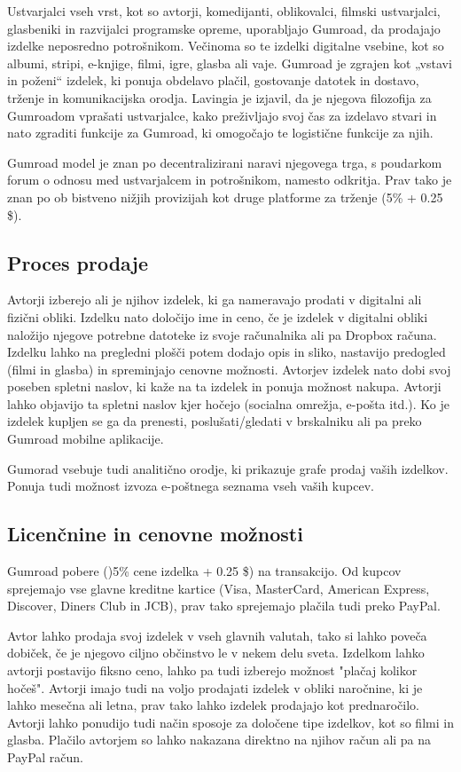 \documentclass[a4paper, 12pt]{book}
\begin{document}
Ustvarjalci vseh vrst, kot so avtorji, komedijanti, oblikovalci, filmski ustvarjalci, glasbeniki in razvijalci programske opreme, uporabljajo Gumroad, da prodajajo izdelke neposredno potrošnikom. Večinoma so te izdelki digitalne vsebine, kot so albumi, stripi, e-knjige, filmi, igre, glasba ali vaje. Gumroad je zgrajen kot „vstavi in poženi“ izdelek, ki ponuja obdelavo plačil, gostovanje datotek in dostavo, trženje in komunikacijska orodja. \cite{49} Lavingia je izjavil, da je njegova filozofija za Gumroadom vprašati ustvarjalce, kako preživljajo svoj čas za izdelavo stvari in nato zgraditi funkcije za Gumroad, ki omogočajo te logistične funkcije za njih. \cite{50}

Gumroad model je znan po decentralizirani naravi njegovega trga, s poudarkom forum o odnosu med ustvarjalcem in potrošnikom, namesto odkritja. Prav tako je znan po ob bistveno nižjih provizijah kot druge platforme za trženje (5\% + 0.25 \$). \cite{51}

\subsection{Proces prodaje}
Avtorji izberejo ali je njihov izdelek, ki ga nameravajo prodati v digitalni ali fizični obliki. Izdelku nato določijo ime in ceno, če je izdelek v digitalni obliki naložijo njegove potrebne datoteke iz svoje računalnika ali pa Dropbox računa. Izdelku lahko na pregledni plošči potem dodajo opis in sliko, nastavijo predogled (filmi in glasba) in spreminjajo cenovne možnosti. Avtorjev izdelek nato dobi svoj poseben spletni naslov, ki kaže na ta izdelek in ponuja možnost nakupa. Avtorji lahko objavijo ta spletni naslov kjer hočejo (socialna omrežja, e-pošta itd.). Ko je izdelek kupljen se ga da prenesti, poslušati/gledati v brskalniku ali pa preko Gumroad mobilne aplikacije.

Gumorad vsebuje tudi analitično orodje, ki prikazuje grafe prodaj vaših izdelkov. Ponuja tudi možnost izvoza e-poštnega seznama vseh vaših kupcev.


\subsection{Licenčnine in cenovne možnosti}
Gumroad pobere ()5\% cene izdelka + 0.25 \$) na transakcijo. Od kupcov sprejemajo vse glavne kreditne kartice (Visa, MasterCard, American Express, Discover, Diners Club in JCB), prav tako sprejemajo plačila tudi preko PayPal. 

Avtor lahko prodaja svoj izdelek v vseh glavnih valutah, tako si lahko poveča dobiček, če je njegovo ciljno občinstvo le v nekem delu sveta. Izdelkom lahko avtorji postavijo fiksno ceno, lahko pa tudi izberejo možnost "plačaj kolikor hočeš". Avtorji imajo tudi na voljo prodajati izdelek v obliki naročnine, ki je lahko mesečna ali letna, prav tako lahko izdelek prodajajo kot prednaročilo. Avtorji lahko ponudijo tudi način sposoje za določene tipe izdelkov, kot so filmi in glasba. Plačilo avtorjem so lahko nakazana direktno na njihov račun ali pa na PayPal račun. 
\end{document}
